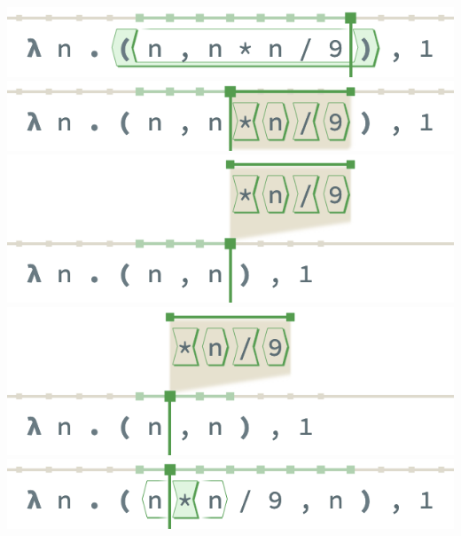 \begin{center}
  \includegraphics[width=0.6\columnwidth]{img/restructuring-full-0.png}
  \includegraphics[width=0.6\columnwidth]{img/restructuring-full-1.png}
  \includegraphics[width=0.6\columnwidth]{img/restructuring-full-2.png}
  \includegraphics[width=0.6\columnwidth]{img/restructuring-full-3.png}
  \includegraphics[width=0.6\columnwidth]{img/restructuring-full-4.png}
\end{center}



